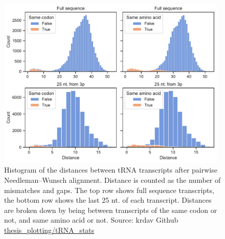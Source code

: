 \begin{figure}
    \centering
    \includegraphics[width=0.98\textwidth]{figures/chap4/tRNA_dist_hist.pdf}
    \caption{Histogram of the distances between tRNA transcripts after pairwise Needleman–Wunsch alignment. Distance is counted as the number of mismatches and gaps. The top row shows full sequence transcripts, the bottom row shows the last 25 nt. of each transcript. Distances are broken down by being between transcripts of the same codon or not, and same amino acid or not. Source: krdav Github \href{https://github.com/krdav/thesis_plotting/blob/main/tRNA_stats/plot_data.ipynb}{thesis\_plotting/tRNA\_stats}}
    \label{fig:dist_hist}
\end{figure}




